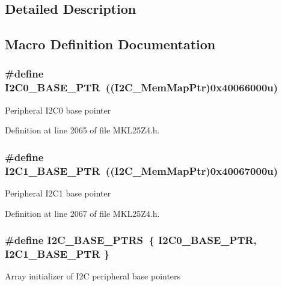 \subsection{Detailed Description}


\subsection{Macro Definition Documentation}
\subsubsection[{\texorpdfstring{I2\+C0\+\_\+\+B\+A\+S\+E\+\_\+\+P\+TR}{I2C0_BASE_PTR}}]{\setlength{\rightskip}{0pt plus 5cm}\#define I2\+C0\+\_\+\+B\+A\+S\+E\+\_\+\+P\+TR~(({\bf I2\+C\+\_\+\+Mem\+Map\+Ptr})0x40066000u)}\hypertarget{group___i2_c___peripheral_ga6db92fda81fa3b6a1c8c6a85e66d51a0}{}\label{group___i2_c___peripheral_ga6db92fda81fa3b6a1c8c6a85e66d51a0}
Peripheral I2\+C0 base pointer 

Definition at line 2065 of file M\+K\+L25\+Z4.\+h.

\subsubsection[{\texorpdfstring{I2\+C1\+\_\+\+B\+A\+S\+E\+\_\+\+P\+TR}{I2C1_BASE_PTR}}]{\setlength{\rightskip}{0pt plus 5cm}\#define I2\+C1\+\_\+\+B\+A\+S\+E\+\_\+\+P\+TR~(({\bf I2\+C\+\_\+\+Mem\+Map\+Ptr})0x40067000u)}\hypertarget{group___i2_c___peripheral_gae13da5d584f2a4e2379db927a3f18772}{}\label{group___i2_c___peripheral_gae13da5d584f2a4e2379db927a3f18772}
Peripheral I2\+C1 base pointer 

Definition at line 2067 of file M\+K\+L25\+Z4.\+h.

\subsubsection[{\texorpdfstring{I2\+C\+\_\+\+B\+A\+S\+E\+\_\+\+P\+T\+RS}{I2C_BASE_PTRS}}]{\setlength{\rightskip}{0pt plus 5cm}\#define I2\+C\+\_\+\+B\+A\+S\+E\+\_\+\+P\+T\+RS~\{ {\bf I2\+C0\+\_\+\+B\+A\+S\+E\+\_\+\+P\+TR}, {\bf I2\+C1\+\_\+\+B\+A\+S\+E\+\_\+\+P\+TR} \}}\hypertarget{group___i2_c___peripheral_gaee17f364d6d1712b62774e6c33dea554}{}\label{group___i2_c___peripheral_gaee17f364d6d1712b62774e6c33dea554}
Array initializer of I2C peripheral base pointers 

